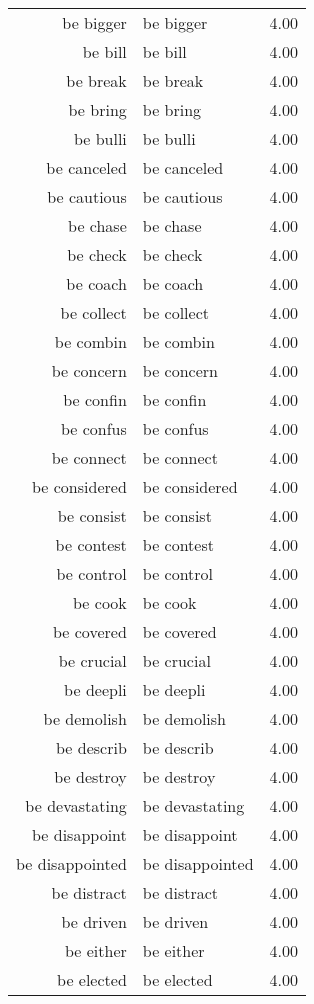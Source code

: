 \begin{table}[ht]
\begin{tabular}{rlr}
  be bigger & be bigger & 4.00 \\ 
  be bill & be bill & 4.00 \\ 
  be break & be break & 4.00 \\ 
  be bring & be bring & 4.00 \\ 
  be bulli & be bulli & 4.00 \\ 
  be canceled & be canceled & 4.00 \\ 
  be cautious & be cautious & 4.00 \\ 
  be chase & be chase & 4.00 \\ 
  be check & be check & 4.00 \\ 
  be coach & be coach & 4.00 \\ 
  be collect & be collect & 4.00 \\ 
  be combin & be combin & 4.00 \\ 
  be concern & be concern & 4.00 \\ 
  be confin & be confin & 4.00 \\ 
  be confus & be confus & 4.00 \\ 
  be connect & be connect & 4.00 \\ 
  be considered & be considered & 4.00 \\ 
  be consist & be consist & 4.00 \\ 
  be contest & be contest & 4.00 \\ 
  be control & be control & 4.00 \\ 
  be cook & be cook & 4.00 \\ 
  be covered & be covered & 4.00 \\ 
  be crucial & be crucial & 4.00 \\ 
  be deepli & be deepli & 4.00 \\ 
  be demolish & be demolish & 4.00 \\ 
  be describ & be describ & 4.00 \\ 
  be destroy & be destroy & 4.00 \\ 
  be devastating & be devastating & 4.00 \\ 
  be disappoint & be disappoint & 4.00 \\ 
  be disappointed & be disappointed & 4.00 \\ 
  be distract & be distract & 4.00 \\ 
  be driven & be driven & 4.00 \\ 
  be either & be either & 4.00 \\ 
  be elected & be elected & 4.00 \\ 

\end{tabular}
\end{table}
